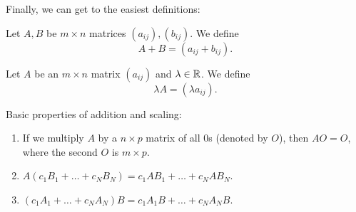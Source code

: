 \documentclass[main.tex]{subfiles}
\begin{document}
Finally, we can get to the easiest definitions:

\begin{definition}
    Let $A, B$ be $m\times n$ matrices $(a_{ij}), (b_{ij})$. We define
    \[A + B = (a_{ij} + b_{ij}).\]
\end{definition}

\begin{definition}
    Let $A$ be an $m\times n$ matrix $(a_{ij})$ and $\lambda \in \mathbb R$. We define
    \[\lambda A = (\lambda a_{ij}).\]
\end{definition}

\begin{proposition}
    Basic properties of addition and scaling:
    \begin{enumerate}
        \item If we multiply $A$ by a $n\times p$ matrix of all $0$s (denoted by $O$), then $AO = O$, where the second $O$ is $m\times p$.
        \item $A(c_1B_1 + \ldots + c_NB_N) = c_1AB_1 + \ldots + c_NAB_N$.
        \item $(c_1A_1 + \ldots + c_NA_N)B = c_1A_1B + \ldots + c_NA_NB$.
    \end{enumerate}
\end{proposition}
\end{document}
